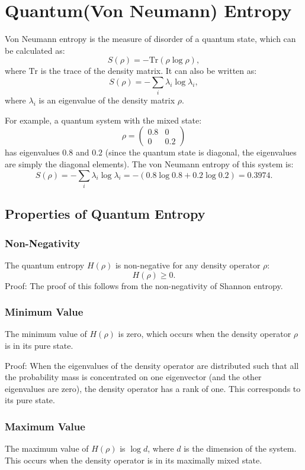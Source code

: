 \section{Quantum(Von Neumann) Entropy}

Von Neumann entropy is the measure of disorder of a quantum state, which can be calculated as:
\[
S(\rho) = -\text{Tr}(\rho \log \rho),
\]
where $\text{Tr}$ is the trace of the density matrix. It can also be written as:
\[
S(\rho) = -\sum_i \lambda_i \log \lambda_i,
\]
where $\lambda_i$ is an eigenvalue of the density matrix $\rho$.

For example, a quantum system with the mixed state:
\[
\rho = 
\begin{pmatrix}
0.8 & 0 \\
0 & 0.2
\end{pmatrix}
\]
has eigenvalues $0.8$ and $0.2$ (since the quantum state is diagonal, the eigenvalues are simply the diagonal elements). The von Neumann entropy of this system is:
\[
S(\rho) = -\sum_i \lambda_i \log \lambda_i = -(0.8 \log 0.8 + 0.2 \log 0.2) = 0.3974.
\]

\subsection{Properties of Quantum Entropy}

\subsubsection{Non-Negativity}
The quantum entropy $H(\rho)$ is non-negative for any density operator $\rho$:
\[
H(\rho) \geq 0.
\]
Proof: The proof of this follows from the non-negativity of Shannon entropy.

\subsubsection{Minimum Value}
The minimum value of $H(\rho)$ is zero, which occurs when the density operator $\rho$ is in its pure state.

Proof: When the eigenvalues of the density operator are distributed such that all the probability mass is concentrated on one eigenvector (and the other eigenvalues are zero), the density operator has a rank of one. This corresponds to its pure state.

\subsubsection{Maximum Value}
The maximum value of $H(\rho)$ is $\log d$, where $d$ is the dimension of the system. This occurs when the density operator is in its maximally mixed state.

